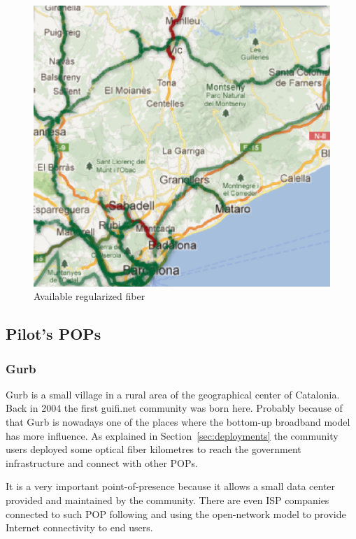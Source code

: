\begin{figure}[htbp]
  \centering
  \includegraphics[scale=.5]{sect3/figures/xoc_map.eps} 
  \caption{Available regularized fiber}
  \label{fig:xoc_map}
\end{figure}


\FloatBarrier
\subsection{Pilot's POPs}

\FloatBarrier
\subsubsection{Gurb}
Gurb is a small village in a rural area of the geographical center of Catalonia. Back in 2004 the first guifi.net community
was born here. Probably because of that Gurb is nowadays one of the places where the bottom-up broadband model has more
influence. As explained in Section~\ref{sec:deployments} the community users deployed some optical fiber kilometres to reach the government
infrastructure and connect with other POPs.


It is a very important point-of-presence because it allows a small data center provided and maintained by the community.
There are even ISP companies connected to such POP following and using the open-network model to provide Internet
connectivity to end users.


